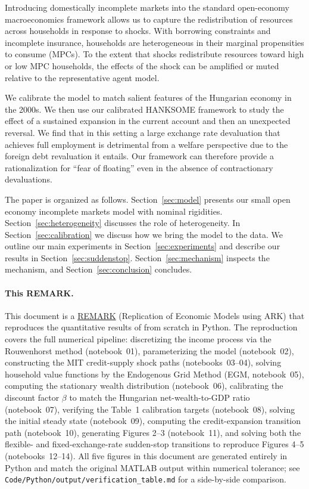 \documentclass[\latexroot/\projectname]{subfiles}
\begin{document}
Introducing domestically incomplete markets into the standard open-economy macroeconomics framework allows us to capture the redistribution of resources across households in response to shocks. With borrowing constraints and incomplete insurance, households are heterogeneous in their marginal propensities to consume (MPCs). To the extent that shocks redistribute resources toward high or low MPC households, the effects of the shock can be amplified or muted relative to the representative agent model.

We calibrate the model to match salient features of the Hungarian economy in the 2000s. We then use our calibrated HANKSOME framework to study the effect of a sustained expansion in the current account and then an unexpected reversal. We find that in this setting a large exchange rate devaluation that achieves full employment is detrimental from a welfare perspective due to the foreign debt revaluation it entails. Our framework can therefore provide a rationalization for ``fear of floating'' even in the absence of contractionary devaluations.

The paper is organized as follows. Section~\ref{sec:model} presents our small open economy incomplete markets model with nominal rigidities. Section~\ref{sec:heterogeneity} discusses the role of heterogeneity. In Section~\ref{sec:calibration} we discuss how we bring the model to the data. We outline our main experiments in Section~\ref{sec:experiments} and describe our results in Section~\ref{sec:suddenstop}. Section~\ref{sec:mechanism} inspects the mechanism, and Section~\ref{sec:conclusion} concludes.

\paragraph{This REMARK.}
This document is a \href{https://github.com/econ-ark/REMARK}{REMARK} (Replication of Economic Models using ARK) that reproduces the quantitative results of \cite{de-Ferra2019-co} from scratch in Python. The reproduction covers the full numerical pipeline: discretizing the income process via the Rouwenhorst method (notebook~01), parameterizing the model (notebook~02), constructing the MIT credit-supply shock paths (notebooks~03--04), solving household value functions by the Endogenous Grid Method (EGM, notebook~05), computing the stationary wealth distribution (notebook~06), calibrating the discount factor $\beta$ to match the Hungarian net-wealth-to-GDP ratio (notebook~07), verifying the Table~1 calibration targets (notebook~08), solving the initial steady state (notebook~09), computing the credit-expansion transition path (notebook~10), generating Figures 2--3 (notebook~11), and solving both the flexible- and fixed-exchange-rate sudden-stop transitions to reproduce Figures 4--5 (notebooks~12--14). All five figures in this document are generated entirely in Python and match the original MATLAB output within numerical tolerance; see \texttt{Code/Python/output/verification\_table.md} for a side-by-side comparison.
\end{document}
